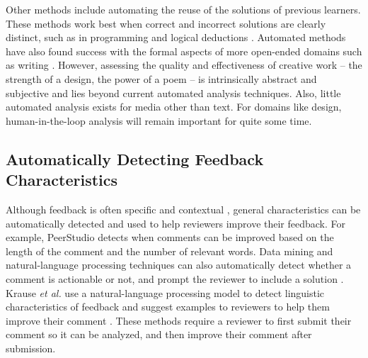 Other methods include automating the reuse of the solutions of previous learners. These methods work best when correct and incorrect solutions are clearly distinct, such as in programming \cite{Glassman2016Learnersourcing, Hartmann2010} and logical deductions \cite{Fast2013}. Automated methods have also found success with the formal aspects of more open-ended domains such as writing \cite{Brooks2014, Roscoe2014}.  However, assessing the quality and effectiveness of creative work – the strength of a design, the power of a poem – is intrinsically abstract and subjective and lies beyond current automated analysis techniques. Also, little automated analysis exists for media other than text. For domains like design, human-in-the-loop analysis will remain important for quite some time. 

\subsection{Automatically Detecting Feedback Characteristics}
Although feedback is often specific and contextual \cite{Schon1983}, general characteristics can be automatically detected and used to help reviewers improve their feedback. For example, PeerStudio \cite{Kulkarni2015} detects when comments can be improved based on the length of the comment and the number of relevant words. Data mining and natural-language processing techniques can also automatically detect whether a comment is actionable or not, and prompt the reviewer to include a solution \cite{Nguyen2016, Xiong2012}. Krause \textit{et al.} use a natural-language processing model to detect linguistic characteristics of feedback and suggest examples to reviewers to help them improve their comment \cite{Krause2017}. These methods require a reviewer to first submit their comment so it can be analyzed, and then improve their comment after submission.
